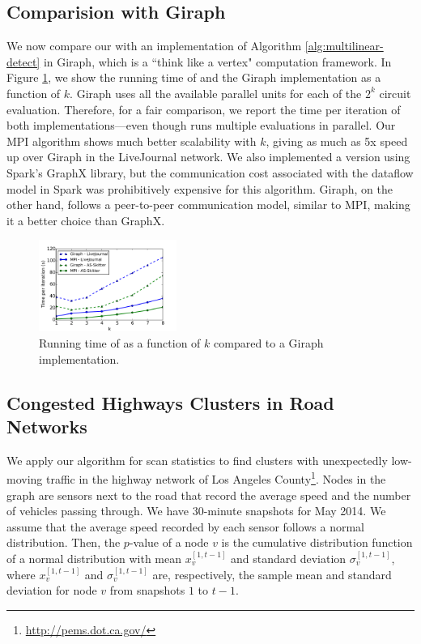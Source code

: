 \subsection{Comparision with Giraph}
\label{sec:compare-giraph}
We now compare our \parmaxwt{} with an implementation of Algorithm \ref{alg:multilinear-detect} in Giraph, which is a ``think like a vertex" computation framework. In Figure \ref{fig:giraph-comparison}, we show the running time of \parmaxwt{} and the Giraph implementation as a function of $k$. Giraph uses all the available parallel units for each of the $2^k$ circuit evaluation. Therefore, for a fair comparison, we report the time per iteration of both implementations---even though \parmaxwt{} runs multiple evaluations in parallel. Our MPI algorithm shows much better scalability with $k$, giving as much as 5x speed up  over Giraph in the LiveJournal network. We also implemented a version using Spark's GraphX library, but the communication cost associated with the dataflow model in Spark was prohibitively expensive for this algorithm. Giraph, on the other hand, follows a peer-to-peer communication model, similar to MPI, making it a better choice than GraphX.

\begin{figure}[!htpb]
\includegraphics[width=0.4\textwidth]{img/giraph-comparison.pdf}
\caption{Running time of \parmaxwt{} as a function of $k$ compared to a Giraph implementation.}
\label{fig:giraph-comparison}
\end{figure}

\subsection{Congested Highways Clusters in Road Networks}
\label{sec:traffic}
We apply our algorithm for scan statistics to find clusters with unexpectedly low-moving traffic in the highway network of Los Angeles County\footnote{\url{http://pems.dot.ca.gov/}}. Nodes in the graph are sensors next to the road that record the average speed and the number of vehicles passing through. We have 30-minute snapshots for May 2014. We assume that the average speed recorded by each sensor follows a normal distribution. Then, the $p$-value of a node $v$ is the cumulative distribution function of a normal distribution with mean  $x_v^{[1,t-1]}$ and standard deviation $\sigma_v^{[1,t-1]}$, where $x_v^{[1,t-1]}$ and $\sigma_v^{[1,t-1]}$ are, respectively, the sample mean and standard deviation for node $v$ from snapshots $1$ to $t-1$.

